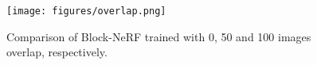 \begin{figure}[ht]
    \centering
    \texttt{[image: figures/overlap.png]}
    \caption[Block-NeRF trained with different amount of overlap.]{Comparison of Block-NeRF trained with 0, 50 and 100 images overlap, respectively.}
    \label{fig:overlap}
\end{figure}